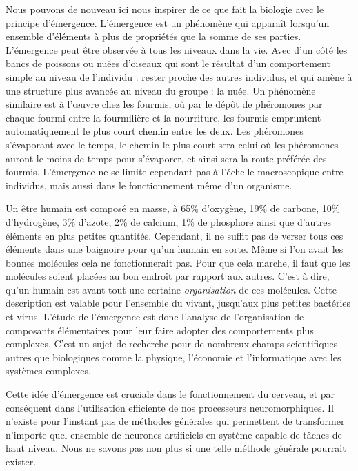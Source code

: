 	Nous pouvons de nouveau ici nous inspirer de ce que fait la biologie avec le principe d'émergence. L'émergence est un phénomène qui apparaît lorsqu'un ensemble d'éléments à plus de propriétés que la somme de ses parties. L'émergence peut être observée à tous les niveaux dans la vie. Avec d'un côté les bancs de poissons ou nuées d'oiseaux qui sont le résultat d'un comportement simple au niveau de l'individu : rester proche des autres individus, et qui amène à une structure plus avancée au niveau du groupe : la nuée. Un phénomène similaire est à l'œuvre chez les fourmis, où par le dépôt de phéromones par chaque fourmi entre la fourmilière et la nourriture, les fourmis empruntent automatiquement le plus court chemin entre les deux. Les phéromones s'évaporant avec le temps, le chemin le plus court sera celui où les phéromones auront le moins de temps pour s'évaporer, et ainsi sera la route préférée des fourmis. L'émergence ne se limite cependant pas à l'échelle macroscopique entre individus, mais aussi dans le fonctionnement même d'un organisme.

	Un être humain est composé en masse, à 65\% d'oxygène, 19\% de carbone, 10\% d'hydrogène, 3\% d'azote, 2\% de calcium, 1\% de phosphore ainsi que d'autres éléments en plus petites quantités. Cependant, il ne suffit pas de verser tous ces éléments dans une baignoire pour qu'un humain en sorte. Même si l'on avait les bonnes molécules cela ne fonctionnerait pas. Pour que cela marche, il faut que les molécules soient placées au bon endroit par rapport aux autres. C'est à dire, qu'un humain est avant tout une certaine \textit{organisation} de ces molécules. Cette description est valable pour l'ensemble du vivant, jusqu'aux plus petites bactéries et virus. L'étude de l'émergence est donc l'analyse de l'organisation de composants élémentaires pour leur faire adopter des comportements plus complexes. C'est un sujet de recherche pour de nombreux champs scientifiques autres que biologiques comme la physique, l'économie et l'informatique avec les systèmes complexes.

	Cette idée d'émergence est cruciale dans le fonctionnement du cerveau, et par conséquent dans l'utilisation efficiente de nos processeurs neuromorphiques. Il n'existe pour l'instant pas de méthodes générales qui permettent de transformer n'importe quel ensemble de neurones artificiels en système capable de tâches de haut niveau. Nous ne savons pas non plus si une telle méthode générale pourrait exister.

